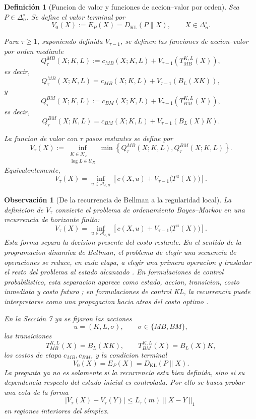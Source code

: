 \documentclass[12pt]{article}
\newtheorem{definicion}{Definición}[section]
\newtheorem{observacion}{Observación}[section]
\begin{document}
\begin{definicion}[Funcion de valor y funciones de accion--valor por orden]\label{def:valor_Q_ordenamiento}
Sea \(P\in\Delta_n^\circ\). Se define el valor terminal por
\[
V_0(X)
:=
E_P(X)
=
D_{\mathrm{KL}}(P\|X),
\qquad
X\in\Delta_n^\circ.
\]

Para \(\tau\ge 1\), suponiendo definida \(V_{\tau-1}\), se definen las funciones de accion--valor por orden mediante
\[
Q_\tau^{MB}(X;K,L)
:=
c_{MB}(X;K,L)
+
V_{\tau-1}\!\left(T_{MB}^{K,L}(X)\right),
\]
es decir,
\[
Q_\tau^{MB}(X;K,L)
=
c_{MB}(X;K,L)
+
V_{\tau-1}\!\left(B_L(XK)\right),
\]
y
\[
Q_\tau^{BM}(X;K,L)
:=
c_{BM}(X;K,L)
+
V_{\tau-1}\!\left(T_{BM}^{K,L}(X)\right),
\]
es decir,
\[
Q_\tau^{BM}(X;K,L)
=
c_{BM}(X;K,L)
+
V_{\tau-1}\!\left(B_L(X)K\right).
\]

La funcion de valor con \(\tau\) pasos restantes se define por
\[
V_\tau(X)
:=
\inf_{\substack{K\in\mathcal K_\varepsilon\\ \log L\in\mathcal U_R}}
\min
\left\{
Q_\tau^{MB}(X;K,L),
Q_\tau^{BM}(X;K,L)
\right\}.
\]
Equivalentemente,
\[
V_\tau(X)
=
\inf_{u\in\mathcal A_{\varepsilon,R}}
\left[
c(X,u)
+
V_{\tau-1}\bigl(T^u(X)\bigr)
\right].
\]
\end{definicion}

\begin{observacion}[De la recurrencia de Bellman a la regularidad local]\label{obs:bellman_regularidad_local}
La definicion de \(V_\tau\) convierte el problema de ordenamiento Bayes--Markov en una recurrencia de horizonte finito:
\[
V_\tau(X)
=
\inf_{u\in\mathcal A_{\varepsilon,R}}
\left[
c(X,u)+V_{\tau-1}\bigl(T^u(X)\bigr)
\right].
\]
Esta forma separa la decision presente del costo restante. En el sentido de la programacion dinamica de Bellman, el problema de elegir una secuencia de operaciones se reduce, en cada etapa, a elegir una primera operacion y trasladar el resto del problema al estado alcanzado \citep{ref18}. En formulaciones de control probabilistico, esta separacion aparece como estado, accion, transicion, costo inmediato y costo futuro \citep{Todorov2009EfficientComputationOptimalActions}; en formulaciones de control KL, la recurrencia puede interpretarse como una propagacion hacia atras del costo optimo \citep{KappenGomezOpper2012OptimalControlAsAGraphicalModelInferenceProblem}.

En la Sección 7 ya se fijaron las acciones
\[
u=(K,L,\sigma),
\qquad
\sigma\in\{MB,BM\},
\]
las transiciones
\[
T_{MB}^{K,L}(X)=B_L(XK),
\qquad
T_{BM}^{K,L}(X)=B_L(X)K,
\]
los costos de etapa \(c_{MB},c_{BM}\), y la condicion terminal
\[
V_0(X)=E_P(X)=D_{\mathrm{KL}}(P\|X).
\]
La pregunta ya no es solamente si la recurrencia esta bien definida, sino si su dependencia respecto del estado inicial es controlada. Por ello se busca probar una cota de la forma
\[
|V_\tau(X)-V_\tau(Y)|
\le
L_\tau(m)\|X-Y\|_1
\]
en regiones interiores del símplex.
\end{observacion}
\end{document}
